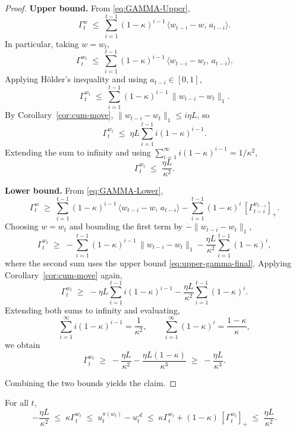 \begin{proof}
\textbf{Upper bound.}  
From \eqref{eq:GAMMA-Upper},
\[
\Gamma_t^{w}
\;\leq\;
\sum_{i=1}^{t-1} (1-\kappa)^{i-1}\,\langle w_{t-i}-w,\,a_{t-i}\rangle .
\]
In particular, taking \(w=w_t\),
\[
\Gamma_t^{w_t}
\;\leq\;
\sum_{i=1}^{t-1} (1-\kappa)^{i-1}\,\langle w_{t-i}-w_t,\,a_{t-i}\rangle .
\]
Applying Hölder’s inequality and using \(a_{t-i}\in[0,1]\),
\[
\Gamma_t^{w_t}
\;\leq\;
\sum_{i=1}^{t-1} (1-\kappa)^{i-1}\,\|w_{t-i}-w_t\|_1 .
\]
By Corollary~\ref{cor:cum-move}, \(\|w_{t-i}-w_t\|_1 \le i\eta L\), so
\[
\Gamma_t^{w_t}
\;\leq\;
\eta L \sum_{i=1}^{t-1} i (1-\kappa)^{i-1}.
\]
Extending the sum to infinity and using \(\sum_{i=1}^\infty i (1-\kappa)^{i-1} = 1/\kappa^2\),
\begin{equation}
\label{eq:upper-gamma-final}
\Gamma_t^{w_t}
\;\leq\;
\frac{\eta L}{\kappa^2}.
\end{equation}

\medskip
\noindent
\textbf{Lower bound.}  
From \eqref{eq:GAMMA-Lower},
\[
\Gamma_t^w
\;\geq\;
\sum_{i=1}^{t-1} (1-\kappa)^{i-1}\,\langle w_{t-i}-w,\,a_{t-i}\rangle
-\sum_{i=1}^{t-1} (1-\kappa)^i\,[\Gamma_{t-i}^{w_{t-i}}]_+ .
\]
Choosing \(w=w_t\) and bounding the first term by \(-\|w_{t-i}-w_t\|_1\),
\[
\Gamma_t^{w_t}
\;\geq\;
-\sum_{i=1}^{t-1} (1-\kappa)^{i-1}\,\|w_{t-i}-w_t\|_1
-\frac{\eta L}{\kappa^2}\sum_{i=1}^{t-1} (1-\kappa)^i ,
\]
where the second sum uses the upper bound \eqref{eq:upper-gamma-final}.  
Applying Corollary~\ref{cor:cum-move} again,
\[
\Gamma_t^{w_t}
\;\geq\;
-\eta L \sum_{i=1}^{t-1} i (1-\kappa)^{i-1}
-\frac{\eta L}{\kappa^2}\sum_{i=1}^{t-1}(1-\kappa)^i .
\]
Extending both sums to infinity and evaluating,
\[
\sum_{i=1}^\infty i (1-\kappa)^{i-1} = \frac{1}{\kappa^2}, 
\qquad
\sum_{i=1}^\infty (1-\kappa)^i = \frac{1-\kappa}{\kappa},
\]
we obtain
\[
\Gamma_t^{w_t}
\;\geq\;
-\frac{\eta L}{\kappa^2} - \frac{\eta L(1-\kappa)}{\kappa^3}
\;\geq\;
-\frac{\eta L}{\kappa^3}.
\]

\medskip
\noindent
Combining the two bounds yields the claim.
\end{proof}






\begin{Thm:Lemma}
\label{lem:u-gap-by-b-gap-eff}
For all \(t\),
\[
-\frac{\eta L}{\kappa^2}
\;\leq\;
\kappa \Gamma_t^{w_t}
\;\leq\;
u_t^{\pi(w_t)} - u_t^\mathcal{A}
\;\leq\;
\kappa \Gamma_t^{w_t}
+(1-\kappa)\,[\Gamma_t^{w_t}]_+
\;\leq\;
\frac{\eta L}{\kappa^2}.
\]
\end{Thm:Lemma}

